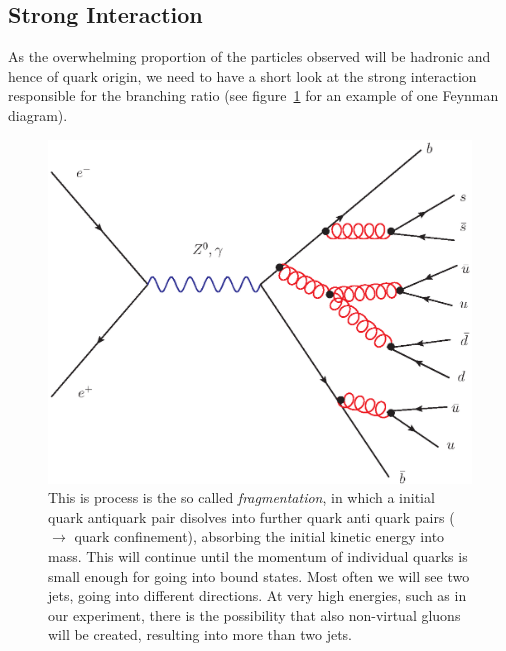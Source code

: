 \subsection{Strong Interaction}
\label{sub:strong}
As the overwhelming proportion of the particles observed will be hadronic and hence of quark origin, we need to have a short
look at the strong interaction responsible for the branching ratio (see figure~\ref{fig:hadrons} for an example of one 
Feynman diagram).
\begin{figure}[htpb]
    \centering
    \includegraphics[width=0.8\linewidth]{figures/hadrons}
    \caption{This is process is the so called \textit{fragmentation}, in which a initial quark antiquark pair disolves into
further quark anti quark pairs ($\rightarrow$ quark confinement), absorbing the initial kinetic energy into mass. This will
continue until the momentum of individual quarks is small enough for going into bound states. Most often we will see two
jets, going into different directions. At very high energies, such as in our experiment, there is the possibility that
also non-virtual gluons will be created, resulting into more than two jets.}
    \label{fig:hadrons}
\end{figure}

